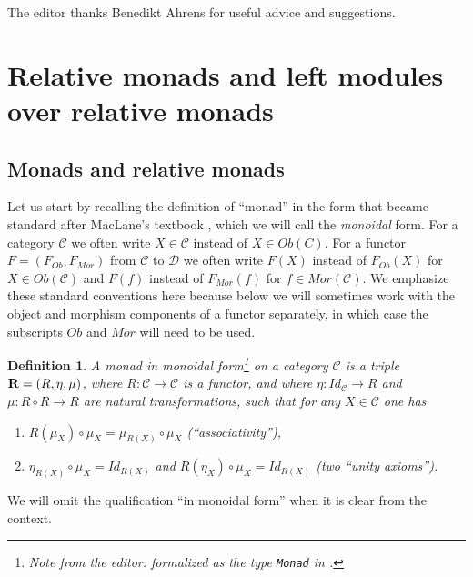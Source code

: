 \documentclass[onecolumn,12pt]{amsart}
\newtheorem{definition}[proposition]{Definition}
\numberwithin{proposition}{subsection}
\newcommand{\sr}{\rightarrow}
\newcommand{\wh}{\widehat}
\newcommand{\R}{{\bf R}}
\newcommand{\C}{{\mathcal C}}
\newcommand{\D}{{\mathcal D}}
\newcommand{\editorfootnote}[1]{\footnote{Note from the editor: #1}}
\begin{document}
The editor thanks Benedikt Ahrens for useful advice and suggestions.


\section{Relative monads and left modules over relative monads}

\subsection{Monads and relative monads} 

Let us start by recalling the definition of ``monad'' in the form that became
standard after MacLane's textbook \cite[p.~133]{MacLane}, which we will call
the {\em monoidal} form. For a category $\C$ we often write $X\in\C$ instead of
$X\in Ob(C)$. For a functor $F=(F_{Ob},F_{Mor})$ from $\C$ to $\D$ we often
write $F(X)$ instead of $F_{Ob}(X)$ for $X\in Ob(\C)$ and $F(f)$ instead of
$F_{Mor}(f)$ for $f\in Mor(\C)$.  We emphasize these standard conventions here
because below we will sometimes work with the object and morphism components of
a functor separately, in which case the subscripts $Ob$ and $Mor$ will need to
be used.
%
\begin{definition}
  \label{2017.04.01.def1}
  A {\em monad in monoidal form}\editorfootnote{formalized as the type {\tt Monad} in \cite{UniMath}.}
  on a category $\C$ is a triple $\R=(R,\eta,\mu)$,
  where $R:\C\sr \C$ is a functor, and where $\eta:Id_{\C}\sr R$ and $\mu:R\circ R\sr R$
  are natural transformations, such that for any $X\in\C$ one has
  \begin{enumerate}
  \item \label{2017.04.19.eq7} $R(\mu_X)\circ \mu_{X}=\mu_{R(X)}\circ \mu_X$ (``associativity''),
  \item \label{2017.04.19.eq8} $\eta_{R(X)}\circ \mu_X=Id_{R(X)}$ and $R(\eta_X)\circ \mu_X=Id_{R(X)}$ (two ``unity axioms'').
  \end{enumerate}
\end{definition}
%
We will omit the qualification ``in monoidal form'' when it is clear from the context. 
\end{document}
